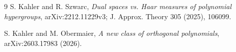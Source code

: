 \documentclass[11pt]{article}
\begin{document}
\begin{thebibliography}{9}
S. Kahler and R. Szwarc,
\emph{Dual spaces vs. Haar measures of polynomial hypergroups},
arXiv:2212.11229v3; J. Approx. Theory 305 (2025), 106099.

S. Kahler and M. Obermaier,
\emph{A new class of orthogonal polynomials},
arXiv:2603.17983 (2026).
\end{thebibliography}
\end{document}
